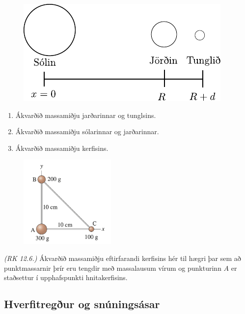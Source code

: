 \ifdefined \wholebook \else\documentclass[oneside]{book}\usepackage{EdlBook}\graphicspath{{figures/}}
\begin{document}
\begin{enumerate}[label = \textbf{Dæmi \thechapter.\arabic*.}]
\begin{figure}[H]
    \centering
    \includegraphics{figures/soljordtungl.pdf}
\end{figure}

\begin{enumerate}[label = \textbf{(\alph*)}]
    \item Ákvarðið massamiðju jarðarinnar og tunglsins.
    \item Ákvarðið massamiðju sólarinnar og jarðarinnar.
    \item Ákvarðið massamiðju kerfisins.
\end{enumerate}


\begin{minipage}{\linewidth}

\begin{figure}
\vspace{-3cm}
\includegraphics[width=1.85in]{images/cmbert.png}
\end{figure}

\item \textit{(RK 12.6.)} Ákvarðið massamiðju eftirfarandi kerfisins hér til hægri þar sem að punktmassarnir þrír eru tengdir með massalausum vírum og punkturinn $A$ er staðsettur í upphafspunkti hnitakerfisins.

\end{minipage}


\newpage

\subsection*{Hverfitregður og snúningsásar}


\end{enumerate}
\end{document}
